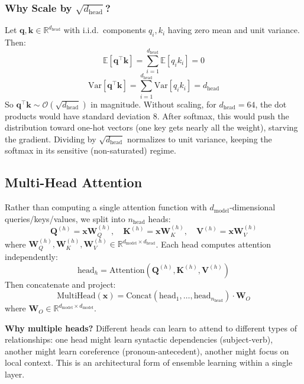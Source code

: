 \documentclass[11pt, a4paper]{article}
\theoremstyle{definition}
\newcommand{\vx}{\bm{x}}
\newcommand{\vq}{\bm{q}}
\newcommand{\vk}{\bm{k}}
\newcommand{\mW}{\bm{W}}
\newcommand{\mQ}{\bm{Q}}
\newcommand{\mK}{\bm{K}}
\newcommand{\mV}{\bm{V}}
\newcommand{\reals}{\mathbb{R}}
\newcommand{\E}{\mathbb{E}}
\newcommand{\Var}{\mathrm{Var}}
\newcommand{\dmodel}{d_{\text{model}}}
\newcommand{\dhead}{d_{\text{head}}}
\newcommand{\nhead}{n_{\text{head}}}
\begin{document}
\subsubsection{Why Scale by $\sqrt{\dhead}$?}

Let $\vq, \vk \in \reals^{\dhead}$ with i.i.d.\ components $q_i, k_i$ having zero mean and unit variance. Then:
\begin{equation}
    \E[\vq^\top \vk] = \sum_{i=1}^{\dhead} \E[q_i k_i] = 0
\end{equation}
\begin{equation}
    \Var[\vq^\top \vk] = \sum_{i=1}^{\dhead} \Var[q_i k_i] = \dhead
\end{equation}
So $\vq^\top \vk \sim \mathcal{O}(\sqrt{\dhead})$ in magnitude. Without scaling, for $\dhead = 64$, the dot products would have standard deviation $8$. After softmax, this would push the distribution toward one-hot vectors (one key gets nearly all the weight), starving the gradient. Dividing by $\sqrt{\dhead}$ normalizes to unit variance, keeping the softmax in its sensitive (non-saturated) regime.

\subsection{Multi-Head Attention}

Rather than computing a single attention function with $\dmodel$-dimensional queries/keys/values, we split into $\nhead$ heads:
\begin{equation}
    \mQ^{(h)} = \vx \mW_Q^{(h)}, \quad \mK^{(h)} = \vx \mW_K^{(h)}, \quad \mV^{(h)} = \vx \mW_V^{(h)}
\end{equation}
where $\mW_Q^{(h)}, \mW_K^{(h)}, \mW_V^{(h)} \in \reals^{\dmodel \times \dhead}$. Each head computes attention independently:
\begin{equation}
    \text{head}_h = \mathrm{Attention}(\mQ^{(h)}, \mK^{(h)}, \mV^{(h)})
\end{equation}
Then concatenate and project:
\begin{equation}
    \mathrm{MultiHead}(\vx) = \mathrm{Concat}(\text{head}_1, \ldots, \text{head}_{\nhead}) \cdot \mW_O
\end{equation}
where $\mW_O \in \reals^{\dmodel \times \dmodel}$.

\textbf{Why multiple heads?} Different heads can learn to attend to different types of relationships: one head might learn syntactic dependencies (subject-verb), another might learn coreference (pronoun-antecedent), another might focus on local context. This is an architectural form of ensemble learning within a single layer.
\end{document}
